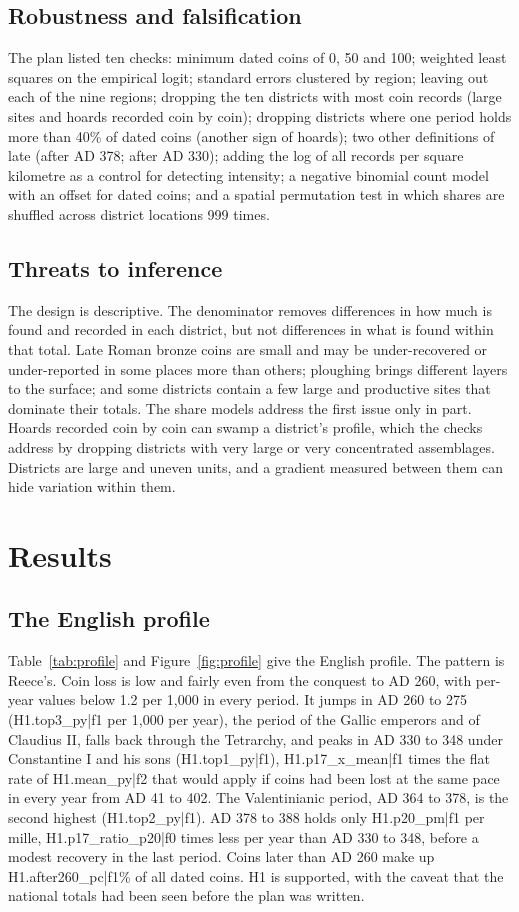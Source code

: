 \documentclass[11pt,a4paper]{article}
\begin{document}
\subsection{Robustness and falsification}
The plan listed ten checks: minimum dated coins of 0, 50 and 100; weighted least squares on the empirical logit; standard errors clustered by region; leaving out each of the nine regions; dropping the ten districts with most coin records (large sites and hoards recorded coin by coin); dropping districts where one period holds more than 40\% of dated coins (another sign of hoards); two other definitions of late (after AD 378; after AD 330); adding the log of all records per square kilometre as a control for detecting intensity; a negative binomial count model with an offset for dated coins; and a spatial permutation test in which shares are shuffled across district locations 999 times.

\subsection{Threats to inference}
The design is descriptive. The denominator removes differences in how much is found and recorded in each district, but not differences in what is found within that total. Late Roman bronze coins are small and may be under-recovered or under-reported in some places more than others; ploughing brings different layers to the surface; and some districts contain a few large and productive sites that dominate their totals. The share models address the first issue only in part. Hoards recorded coin by coin can swamp a district's profile, which the checks address by dropping districts with very large or very concentrated assemblages. Districts are large and uneven units, and a gradient measured between them can hide variation within them.

\section{Results}\label{sec:results}
\subsection{The English profile}
Table~\ref{tab:profile} and Figure~\ref{fig:profile} give the English profile. The pattern is Reece's. Coin loss is low and fairly even from the conquest to AD 260, with per-year values below 1.2 per 1,000 in every period. It jumps in AD 260 to 275 ({{H1.top3_py|f1}} per 1,000 per year), the period of the Gallic emperors and of Claudius II, falls back through the Tetrarchy, and peaks in AD 330 to 348 under Constantine I and his sons ({{H1.top1_py|f1}}), {{H1.p17_x_mean|f1}} times the flat rate of {{H1.mean_py|f2}} that would apply if coins had been lost at the same pace in every year from AD 41 to 402. The Valentinianic period, AD 364 to 378, is the second highest ({{H1.top2_py|f1}}). AD 378 to 388 holds only {{H1.p20_pm|f1}} per mille, {{H1.p17_ratio_p20|f0}} times less per year than AD 330 to 348, before a modest recovery in the last period. Coins later than AD 260 make up {{H1.after260_pc|f1}}\% of all dated coins. H1 is supported, with the caveat that the national totals had been seen before the plan was written.
\end{document}
